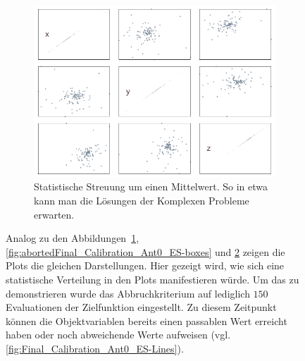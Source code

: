 \begin{figure}[!ht]
\begin{subfigure}[t]{0.45\textwidth}
             \label{fig:abortedFinal_Calibration_Ant0_ES-Lines}
     \end{subfigure}
%
\\
%
     \begin{subfigure}[t]{0.4\textwidth}
             \centering
             \includegraphics[width=\textwidth]{img/calibration/aborted_calibration_ant0-scatter.png}
             \caption{Statistische Streuung um einen Mittelwert. So in etwa kann man die Lösungen der Komplexen Probleme erwarten.}
             \label{fig:abortedFinal_Calibration_Ant0_ES-Scatter}
     \end{subfigure}
%
     \caption[Statistisch verteilte Ergebnisse der Kalibrierung mittels ES]{Analog zu den Abbildungen~\ref        {fig:abortedFinal_Calibration_Ant0_ES-Lines}, \ref{fig:abortedFinal_Calibration_Ant0_ES-boxes} und \ref{fig:abortedFinal_Calibration_Ant0_ES-Scatter} zeigen die Plots die gleichen Darstellungen. Hier gezeigt wird, wie sich eine statistische Verteilung in den Plots manifestieren würde. Um das zu demonstrieren wurde das Abbruchkriterium auf lediglich $150$ Evaluationen der Zielfunktion eingestellt. Zu diesem Zeitpunkt können die Objektvariablen bereits einen passablen Wert erreicht haben oder noch abweichende Werte aufweisen (vgl. \ref{fig:Final_Calibration_Ant0_ES-Lines}).}
     \label{fig::abortedFinal_Calibration_Ant0_ES}
\end{figure}
%
